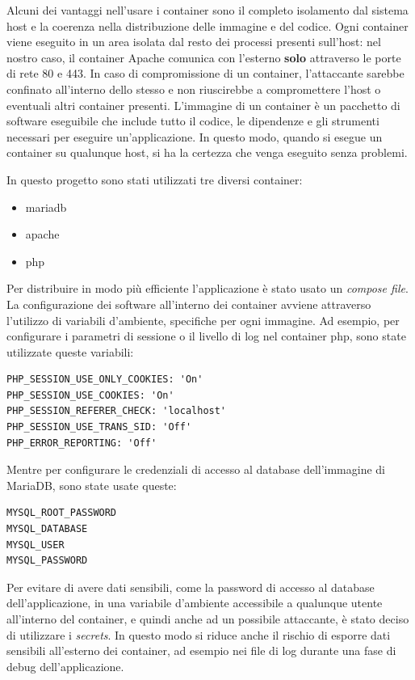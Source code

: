 \documentclass[italian,12pt,a4paper,oneside,final]{report}
\begin{document}
Alcuni dei vantaggi nell'usare i container sono il completo isolamento dal sistema host e la coerenza nella distribuzione delle immagine e del codice.
Ogni container viene eseguito in un area isolata dal resto dei processi presenti sull'host: nel nostro caso, il container Apache comunica con l'esterno \textbf{solo} attraverso le porte di rete 80 e 443.
In caso di compromissione di un container, l'attaccante sarebbe confinato all'interno dello stesso e non riuscirebbe a compromettere l'host o eventuali altri container presenti.
L'immagine di un container è un pacchetto di software eseguibile che include tutto il codice, le dipendenze e gli strumenti necessari per eseguire un’applicazione.
In questo modo, quando si esegue un container su qualunque host, si ha la certezza che venga eseguito senza problemi.

In questo progetto sono stati utilizzati tre diversi container:

\begin{itemize}
	\item mariadb
	\item apache
	\item php
\end{itemize}

\noindent Per distribuire in modo più efficiente l'applicazione è stato usato un \textit{compose file}.
La configurazione dei software all'interno dei container avviene attraverso l'utilizzo di variabili d'ambiente, specifiche per ogni immagine.
Ad esempio, per configurare i parametri di sessione o il livello di log nel container php, sono state utilizzate queste variabili:
\hfill \break
\begin{lstlisting}[caption=Variabili container php]
PHP_SESSION_USE_ONLY_COOKIES: 'On'
PHP_SESSION_USE_COOKIES: 'On'
PHP_SESSION_REFERER_CHECK: 'localhost'
PHP_SESSION_USE_TRANS_SID: 'Off'
PHP_ERROR_REPORTING: 'Off'
\end{lstlisting}
Mentre per configurare le credenziali di accesso al database dell'immagine di MariaDB, sono state usate queste:
\hfill \break
\begin{lstlisting}[caption=Variabili container mariadb]
MYSQL_ROOT_PASSWORD
MYSQL_DATABASE
MYSQL_USER
MYSQL_PASSWORD
\end{lstlisting}
Per evitare di avere dati sensibili, come la password di accesso al database dell'applicazione, in una variabile d'ambiente accessibile a qualunque utente all'interno del container, e quindi anche ad un possibile attaccante, è stato deciso di utilizzare i \textit{secrets}.
In questo modo si riduce anche il rischio di esporre dati sensibili all'esterno dei container, ad esempio nei file di log durante una fase di debug dell'applicazione.
\end{document}

